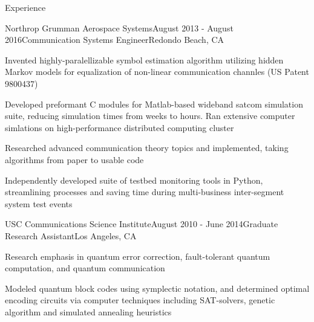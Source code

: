 \documentclass{resume} %
\begin{document}
\begin{rSection}{Experience}
\begin{rSubsection}{Northrop Grumman Aerospace Systems}{August 2013 - August 2016}{Communication Systems Engineer}{Redondo Beach, CA}
\item Invented highly-paralellizable symbol estimation algorithm utilizing hidden Markov models for equalization of non-linear communication channles (US Patent 9800437)
\item Developed preformant C modules for Matlab-based wideband satcom simulation suite, reducing simulation times from weeks to hours. Ran extensive computer simlations on high-performance distributed computing cluster
\item Researched advanced communication theory topics and implemented, taking algorithms from paper to usable code
\item Independently developed suite of testbed monitoring tools in Python, streamlining processes and saving time during multi-business inter-segment system test events
\end{rSubsection}

\begin{rSubsection}{USC Communications Science Institute}{August 2010 - June 2014}{Graduate Research Assistant}{Los Angeles, CA}
\item Research emphasis in quantum error correction, fault-tolerant quantum computation, and quantum communication
\item Modeled quantum block codes using symplectic notation, and determined optimal encoding circuits via computer techniques including SAT-solvers, genetic algorithm and simulated annealing heuristics
\end{rSubsection}


\end{rSection}
\end{document}
